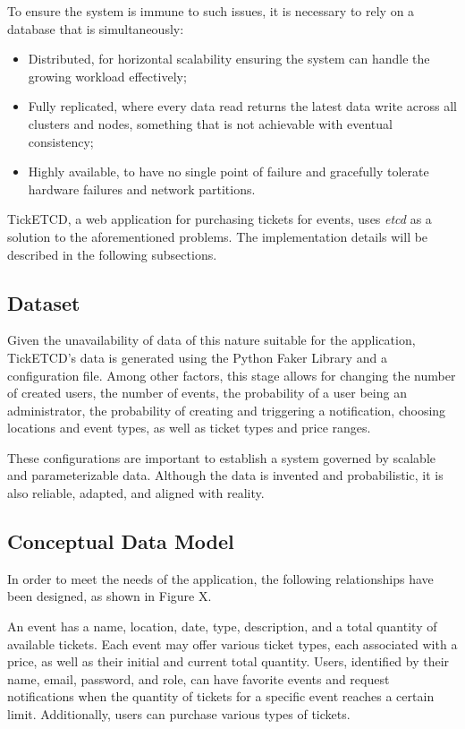 \documentclass[screen,review]{acmart}
\begin{document}
To ensure the system is immune to such issues, it is necessary to rely on a database that is simultaneously:

\begin{itemize}
    \item Distributed, for horizontal scalability ensuring the system can handle the growing workload effectively;
    \item Fully replicated, where every data read returns the latest data write across all clusters and nodes, something that is not achievable with eventual consistency;
    \item Highly available, to have no single point of failure and gracefully tolerate hardware failures and network partitions.
\end{itemize}

TickETCD, a web application for purchasing tickets for events, uses \textit{etcd} as a solution to the aforementioned problems. The implementation details will be described in the following subsections.

\subsection{Dataset}
Given the unavailability of data of this nature suitable for the application, TickETCD's data is generated using the Python Faker Library \cite{faker} and a configuration file. Among other factors, this stage allows for changing the number of created users, the number of events, the probability of a user being an administrator, the probability of creating and triggering a notification, choosing locations and event types, as well as ticket types and price ranges.

These configurations are important to establish a system governed by scalable and parameterizable data. Although the data is invented and probabilistic, it is also reliable, adapted, and aligned with reality.

\subsection{Conceptual Data Model}
In order to meet the needs of the application, the following relationships have been designed, as shown in Figure X.

An event has a name, location, date, type, description, and a total quantity of available tickets. Each event may offer various ticket types, each associated with a price, as well as their initial and current total quantity. Users, identified by their name, email, password, and role, can have favorite events and request notifications when the quantity of tickets for a specific event reaches a certain limit. Additionally, users can purchase various types of tickets.
\end{document}
